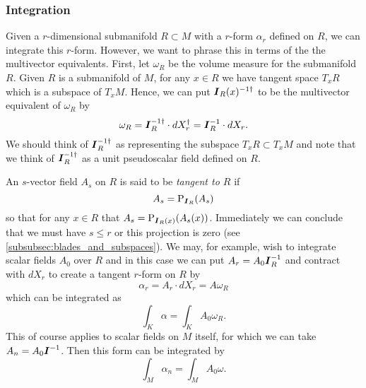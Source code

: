 \subsubsection{Integration}
\label{subsubsec:integration_on_submanifolds}

Given a $r$-dimensional submanifold $R \subset M$ with a $r$-form $\alpha_r$ defined on $R$, we can integrate this $r$-form. However, we want to phrase this in terms of the the multivector equivalents.  First, let $\omega_R$ be the volume measure for the submanifold $R$.  Given $R$ is a submanifold of $M$, for any $x \in R$ we have tangent space $T_x R$ which is a subspace of $T_x M$. Hence, we can put $\boldsymbol{I}_R(x)^{-1 \dagger}$ to be the multivector equivalent of $\omega_R$ by
\begin{equation}
\omega_R = \boldsymbol{I}_R^{-1 \dagger} \cdot dX_r^\dagger = \boldsymbol{I}_R^{-1} \cdot dX_r.
\end{equation}
We should think of $\boldsymbol{I}_R^{-1 \dagger}$ as representing the subspace $T_x R \subset T_x M$ and note that we think of $\boldsymbol{I}_R^{-1 \dagger}$ as a unit pseudoscalar field defined on $R$. 

An $s$-vector field $A_s$ on $R$ is said to be \emph{tangent to $R$} if
\begin{equation}
A_s = \operatorname{P}_{\boldsymbol{I}_R}(A_s)
\end{equation} 
so that for any $x \in R$ that $A_s = \operatorname{P}_{\boldsymbol{I}_R(x)}(A_s(x))$. Immediately we can conclude that we must have $s\leq r$ or this projection is zero (see \cref{subsubsec:blades_and_subspaces}). We may, for example, wish to integrate scalar fields $A_0$ over $R$ and in this case we can put $A_r = A_0 \boldsymbol{I}_R^{-1}$ and contract with $dX_r$ to create a tangent $r$-form on $R$ by 
\begin{equation}
\alpha_r = A_r \cdot dX_r = A \omega_R
\end{equation}
which can be integrated as
\begin{equation}
\int_K \alpha = \int_K A_0 \omega_R.
\end{equation}
This of course applies to scalar fields on $M$ itself, for which we can take $A_n = A_0 \boldsymbol{I}^{-1}$. Then this form can be integrated by
\begin{equation}
\int_M \alpha_n = \int_M A_0 \omega.
\end{equation}

